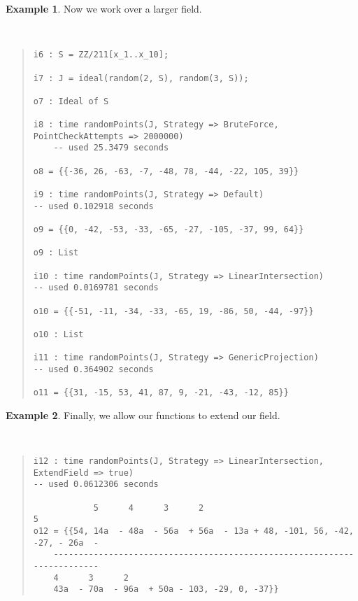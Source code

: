 \documentclass[11pt]{amsart}
\theoremstyle{definition}
\newtheorem{example}{Example}[section]
\begin{document}
\begin{example}Now we work over a larger field.
        {{\small\color{blue}
        ~~
        \begin{quote}
\begin{verbatim}
i6 : S = ZZ/211[x_1..x_10];

i7 : J = ideal(random(2, S), random(3, S));

o7 : Ideal of S

i8 : time randomPoints(J, Strategy => BruteForce, PointCheckAttempts => 2000000)
    -- used 25.3479 seconds

o8 = {{-36, 26, -63, -7, -48, 78, -44, -22, 105, 39}}

i9 : time randomPoints(J, Strategy => Default)
-- used 0.102918 seconds

o9 = {{0, -42, -53, -33, -65, -27, -105, -37, 99, 64}}

o9 : List

i10 : time randomPoints(J, Strategy => LinearIntersection)
-- used 0.0169781 seconds

o10 = {{-51, -11, -34, -33, -65, 19, -86, 50, -44, -97}}

o10 : List

i11 : time randomPoints(J, Strategy => GenericProjection)
-- used 0.364902 seconds

o11 = {{31, -15, 53, 41, 87, 9, -21, -43, -12, 85}}      
    \end{verbatim}
\end{quote}\vspace{-1em}
        }}
    \end{example}

    \begin{example}
        Finally, we allow our functions to extend our field.
        {{\small\color{blue}
        ~~
        \begin{quote}
        \begin{verbatim}
i12 : time randomPoints(J, Strategy => LinearIntersection, ExtendField => true)
-- used 0.0612306 seconds

            5      4      3      2                                      5  
o12 = {{54, 14a  - 48a  - 56a  + 56a  - 13a + 48, -101, 56, -42, -27, - 26a  -
    -------------------------------------------------------------------------
    4      3      2
    43a  - 70a  - 96a  + 50a - 103, -29, 0, -37}}
        \end{verbatim}
    \end{quote}
        }}
    \end{example}
\end{document}
